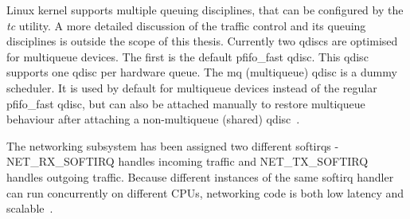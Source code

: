 Linux kernel supports multiple queuing disciplines, that can be configured by the {\it{tc}} utility.
A more detailed discussion of the traffic control and its queuing disciplines is outside the scope of this thesis.
Currently two qdiscs are optimised for multiqueue devices.
The first is the default pfifo\_fast qdisc.
This qdisc supports one qdisc per hardware queue.
The mq (multiqueue) qdisc is a dummy scheduler.
It is used by default for multiqueue devices instead of the regular pfifo\_fast qdisc,
but can also be attached manually to restore multiqueue behaviour
after attaching a non-multiqueue (shared) qdisc~\cite{kernel-doc-multiqueue}.


The networking subsystem has been assigned two different softirqs -
NET\_RX\_SOFTIRQ handles incoming traffic and NET\_TX\_SOFTIRQ handles outgoing traffic.
Because different instances of the same softirq handler can run concurrently on different CPUs,
networking code is both low latency and scalable~\cite{understanding-internals}.


